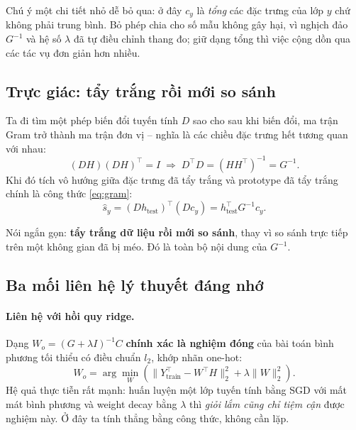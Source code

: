 \documentclass[11pt,a4paper]{article}
\newenvironment{luuy}{\begin{leftbar}\noindent\ignorespaces}{\end{leftbar}}
\begin{document}
Chú ý một chi tiết nhỏ dễ bỏ qua: ở đây $c_y$ là \emph{tổng} các đặc trưng của
lớp $y$ chứ không phải trung bình. Bỏ phép chia cho số mẫu không gây hại, vì
nghịch đảo $G^{-1}$ và hệ số $\lambda$ đã tự điều chỉnh thang đo; giữ dạng tổng
thì việc cộng dồn qua các tác vụ đơn giản hơn nhiều.

\subsection{Trực giác: tẩy trắng rồi mới so sánh}

Ta đi tìm một phép biến đổi tuyến tính $D$ sao cho sau khi biến đổi, ma trận Gram
trở thành ma trận đơn vị -- nghĩa là các chiều đặc trưng hết tương quan với nhau:
\begin{equation}
(DH)(DH)^{\top} = I \;\Longrightarrow\; D^{\top}D = (HH^{\top})^{-1} = G^{-1}.
\end{equation}
Khi đó tích vô hướng giữa đặc trưng đã tẩy trắng và prototype đã tẩy trắng chính
là công thức \eqref{eq:gram}:
\begin{equation}
\hat s_y = (D h_{\text{test}})^{\top}(D c_y)
         = h_{\text{test}}^{\top} G^{-1} c_y .
\end{equation}

\begin{luuy}
Nói ngắn gọn: \textbf{tẩy trắng dữ liệu rồi mới so sánh}, thay vì so sánh trực
tiếp trên một không gian đã bị méo. Đó là toàn bộ nội dung của $G^{-1}$.
\end{luuy}

\subsection{Ba mối liên hệ lý thuyết đáng nhớ}

\paragraph{Liên hệ với hồi quy ridge.}
Dạng $W_o = (G + \lambda I)^{-1} C$ \textbf{chính xác là nghiệm đóng} của bài
toán bình phương tối thiểu có điều chuẩn $l_2$, khớp nhãn one-hot:
\begin{equation}
W_o = \arg\min_{W}
\left( \|Y_{\text{train}}^{\top} - W^{\top}H\|_2^2 + \lambda\|W\|_2^2 \right).
\end{equation}
Hệ quả thực tiễn rất mạnh: huấn luyện một lớp tuyến tính bằng SGD với mất mát
bình phương và weight decay bằng $\lambda$ thì \emph{giỏi lắm cũng chỉ tiệm cận}
được nghiệm này. Ở đây ta tính thẳng bằng công thức, không cần lặp.
\end{document}
